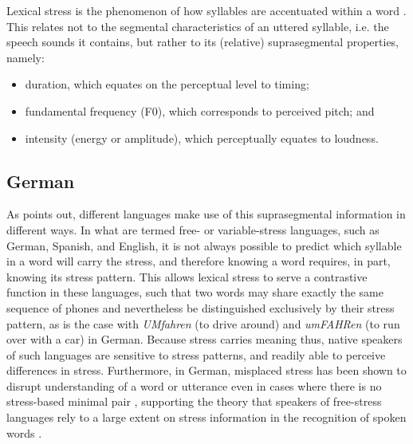 			Lexical stress is the phenomenon of how syllables are accentuated within a word  \citep{Cutler2005}.  This relates not to the segmental characteristics of an uttered syllable, i.e. the speech sounds it contains, but rather to its (relative) suprasegmental properties, namely: %
			\begin{itemize}
			\item duration, which equates on the perceptual level to timing;
			\item fundamental frequency (F0), which corresponds to perceived pitch; and
			\item intensity (energy or amplitude), which perceptually equates to loudness.
			\end{itemize}

	\subsection{German}
	\label{sec:stress:german}
	
		
		
					As \textcite{Cutler2005} points out, different languages make use of this suprasegmental information in different ways.
			In what are termed free- or variable-stress languages, such as German, Spanish, and English, it is not always possible to predict which syllable in a word will carry the stress, and therefore knowing a word requires, in part, knowing its stress pattern. This allows lexical stress to serve a contrastive function in these languages, such that two words may share exactly the same sequence of phones and nevertheless be distinguished exclusively by their stress pattern, as is the case with \textit{UMfahren} (to drive around) and \textit{umFAHRen} (to run over with a car) in German. %
Because stress carries meaning thus, native speakers of such languages are sensitive to stress patterns, and readily able to perceive differences in stress. %
Furthermore, in German, misplaced stress has been shown to disrupt understanding of a word or utterance even in cases where there is no stress-based minimal pair \citep{Hirschfeld1994}, supporting the theory that speakers of free-stress languages rely to a large extent on stress information in the recognition of spoken words \citep{Cutler2005}.

